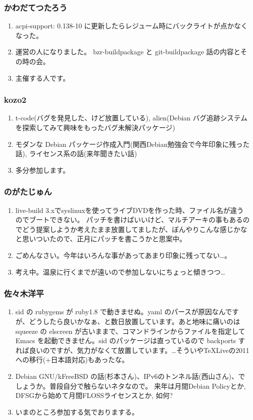 \documentclass[cjk,dvipdfmx,10pt,%
hyperref={bookmarks=true,bookmarksnumbered=true,bookmarksopen=false,%
colorlinks=false,%
pdftitle={第 54 回 関西 Debian 勉強会},%
pdfauthor={倉敷・のがた・佐々木},%
pdfsubject={資料},%
}]{beamer}
\begin{document}
\begin{frame}[fragile]
\frametitle{ かわだてつたろう }
  \begin{enumerate}
  \item acpi-support: 0.138-10 に更新したらレジューム時にバックライトが点かなくなった。
  \item 運営の人になりました。
    bzr-buildpackage と git-buildpackage 話の内容とその時の会。
  \item 主催する人です。
  \end{enumerate}
\end{frame}

\begin{frame}[fragile]
\frametitle{ kozo2 }
  \begin{enumerate}
  \item
    t-code(バグを発見した、けど放置している), alien(Debian バグ追跡システムを探索してみて興味をもったバグ未解決パッケージ)
  \item
    モダンな Debian パッケージ作成入門(関西Debian勉強会で今年印象に残った話), ライセンス系の話(来年聞きたい話)
  \item
    多分参加します。
  \end{enumerate}
\end{frame}

\begin{frame}[fragile]
\frametitle{ のがたじゅん }
  \begin{enumerate}
  \item live-build 3.xでsyslinuxを使ってライブDVDを作った時、ファイル名が違うのでブートできない。
    パッチを書けばいいけど、マルチアーキの事もあるのでどう提案しようか考えたまま放置してましたが、ぼんやりこんな感じかなと思いついたので、正月にパッチを書こうかと思案中。
  \item
    ごめんなさい。今年はいろんな事があってあまり印象に残ってない…。
  \item
    考え中。温泉に行くまでが遠いので参加しないにちょっと傾きつつ…
  \end{enumerate}
\end{frame}

\begin{frame}[fragile]
\frametitle{ 佐々木洋平 }
  \begin{enumerate}
  \item sid の rubygems が ruby1.8 で動きませぬ。yaml のパースが原因なんですが、どうしたら良いかなぁ、と数日放置しています。あと地味に痛いのは squeeze の elscreen が古いままで、コマンドラインからファイルを指定して Emacs を起動できません。sid のパッケージは直っているので backports すれば良いのですが、気力がなくて放置しています。…そういや\TeX Liveの2011への移行(+日本語対応)もあったな。
  \item Debian GNU/kFreeBSD の話(杉本さん)、IPv6のトンネル話(西山さん)、でしょうか。普段自分で触らないネタなので。
    来年は月間Debian Policyとか, DFSGから始めて月間FLOSSライセンスとか, 如何?
  \item いまのところ参加する気でおりまする。
  \end{enumerate}
\end{frame}
\end{document}
